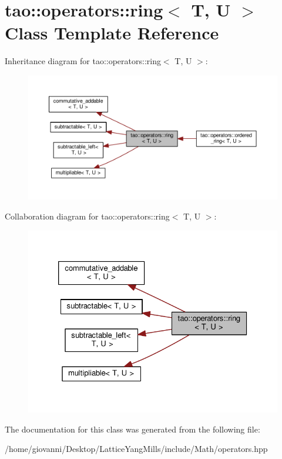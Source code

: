 \hypertarget{classtao_1_1operators_1_1ring}{}\section{tao\+:\+:operators\+:\+:ring$<$ T, U $>$ Class Template Reference}
\label{classtao_1_1operators_1_1ring}


Inheritance diagram for tao\+:\+:operators\+:\+:ring$<$ T, U $>$\+:\nopagebreak
\begin{figure}[H]
\begin{center}
\leavevmode
\includegraphics[width=350pt]{classtao_1_1operators_1_1ring__inherit__graph}
\end{center}
\end{figure}


Collaboration diagram for tao\+:\+:operators\+:\+:ring$<$ T, U $>$\+:\nopagebreak
\begin{figure}[H]
\begin{center}
\leavevmode
\includegraphics[width=326pt]{classtao_1_1operators_1_1ring__coll__graph}
\end{center}
\end{figure}


The documentation for this class was generated from the following file\+:\begin{DoxyCompactItemize}
\item 
/home/giovanni/\+Desktop/\+Lattice\+Yang\+Mills/include/\+Math/operators.\+hpp\end{DoxyCompactItemize}

